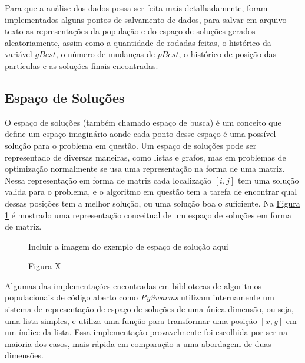         Para que a análise dos dados possa ser feita mais detalhadamente, foram implementados alguns pontos de salvamento de dados, para salvar em arquivo texto as representações da população e do espaço de soluções gerados aleatoriamente, assim como a quantidade de rodadas feitas, o histórico da variável $gBest$, o número de mudanças de $pBest$, o histórico de posição das partículas e as soluções finais encontradas.
    

    \subsection{Espaço de Soluções}
            O espaço de soluções (também chamado espaço de busca) é um conceito que define um espaço imaginário aonde cada ponto desse espaço é uma possível solução para o problema em questão. 
            Um espaço de soluções pode ser representado de diversas maneiras, como listas e grafos, mas em problemas de optimização normalmente se usa uma representação na forma de uma matriz.\\
        

            Nessa representação em forma de matriz cada localização $[i, j]$ tem uma solução valida para o problema, e o algoritmo em questão tem a tarefa de encontrar qual dessas posições tem a melhor solução, ou uma solução boa o suficiente. Na 
            \hyperref[fig:solution-space]{Figura \ref{fig:solution-space}} 
            é mostrado uma representação conceitual de um espaço de soluções em forma de matriz.\hfill
            
            \begin{figure}[ht]
                \centering
                \small{Incluir a imagem do exemplo de espaço de solução aqui}
                \caption{Figura X}
                \label{fig:solution-space}
            \end{figure}

            Algumas das implementações encontradas em bibliotecas de algoritmos populacionais de código aberto como \textit{PySwarms} utilizam internamente um sistema de representação de espaço de soluções de uma única dimensão, ou seja, uma lista simples, e utiliza uma função para transformar uma posição $[x,y]$ em um índice da lista. Essa implementação provavelmente foi escolhida por ser na maioria dos casos, mais rápida em comparação a uma abordagem de duas dimensões.\\


